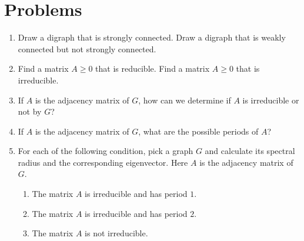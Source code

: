 \documentclass{article}
\theoremstyle{definition}
\begin{document}
\section*{Problems}
\begin{enumerate}
\setlength\itemsep{2em}
\item Draw a digraph that is strongly connected.  Draw a digraph that is weakly connected but not strongly connected.
\item Find a matrix $A \geq 0$ that is reducible.  Find a matrix $A \geq 0$ that is irreducible.
\item If $A$ is the adjacency matrix of $G$, how can we determine if $A$ is irreducible or not by $G$?
\item If $A$ is the adjacency matrix of $G$, what are the possible periods of $A$? 
\item For each of the following condition, pick a graph $G$ and calculate its spectral radius and the corresponding eigenvector.  Here $A$ is the adjacency matrix of $G$.
\begin{enumerate}
\item The matrix $A$ is irreducible and has period $1$.
\item The matrix $A$ is irreducible and has period $2$.
\item The matrix $A$ is not irreducible.
\end{enumerate}
\end{enumerate}

\end{document}
